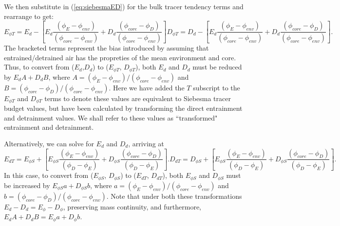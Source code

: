 \documentclass[12pt]{article}
\begin{document}
We then substitute in (\ref{eq:siebesmaED})
for the bulk tracer tendency terms and 
rearrange to get:
\begin{subequations}
  \label{eq:correctedED}
\begin{equation}
  \label{eq:corrected_entrainment}
    E_{\phi T} = E_d 
             - \left[E_d\frac{(\phi_E - \phi_{env})}{(\phi_{core} - \phi_{env})}
                   + D_d\frac{(\phi_{core} - \phi_D)}{(\phi_{core} - \phi_{env})}\right]
\end{equation}
\begin{equation}
  \label{eq:corrected_detrainment}
    D_{\phi T} = D_d
             - \left[E_d\frac{(\phi_E - \phi_{env})}{(\phi_{core} - \phi_{env})}
                   + D_d\frac{(\phi_{core} - \phi_D)}{(\phi_{core} - \phi_{env})}\right].
\end{equation}
\end{subequations}
The bracketed terms represent the bias introduced by assuming that
entrained/detrained air has the propreties of the mean environment and
core.  Thus, to convert from ($E_d$,$D_d$) to ($E_{\phi T}$, $D_{\phi  T}$), 
both $E_d$ and $D_d$ must be reduced by $E_d A + D_d B$, where
$A = (\phi_E - \phi_{env})/(\phi_{core} - \phi_{env})$ and $B =
(\phi_{core} - \phi_D)/(\phi_{core} - \phi_{env})$.  Here we have
added the $T$ subscript to the $E_{\phi T}$ and $D_{\phi T}$ terms to
denote these values are equivalent to Siebesma tracer budget values,
but have been calculated by transforming the direct entrainment and
detrainment values.  We shall refer to these values as ``transformed"
entrainment and detrainment.

Alternatively, we can solve for $E_d$ and $D_d$, arriving at
\begin{subequations}
\begin{equation}
  \label{eq:corrected_entrainment2}
    E_{d T} = E_{\phi S} 
        + \left[E_{\phi S}\frac{(\phi_E - \phi_{env})}{(\phi_D - \phi_E)} 
              + D_{\phi S}\frac{(\phi_{core} - \phi_D)}{(\phi_D - \phi_E)}\right].
\end{equation}
\begin{equation}
  \label{eq:corrected_detrainment2}
    D_{d T} = D_{\phi S} 
        + \left[E_{\phi S}\frac{(\phi_E - \phi_{env})}{(\phi_D - \phi_E)}
              + D_{\phi S}\frac{(\phi_{core} - \phi_D)}{(\phi_D - \phi_E)}\right].
\end{equation}
\end{subequations}
In this case, to convert from ($E_{\phi S}$, $D_{\phi S}$) to
($E_{dT}$, $D_{dT}$), both $E_{\phi S}$ and $D_{\phi S}$ must be
increased by $E_{\phi S} a + D_{\phi S} b$, where $a = (\phi_E -
\phi_{env})/(\phi_{core} - \phi_{env})$ and $b = (\phi_{core} -
\phi_D)/(\phi_{core} - \phi_{env})$.  Note that under both these
transformations $E_d-D_d = E_{\phi}-D_{\phi}$, preserving mass
continuity, and furthermore, $E_d A + D_d B = E_{\phi} a + D_{\phi}
b$.
\end{document}
